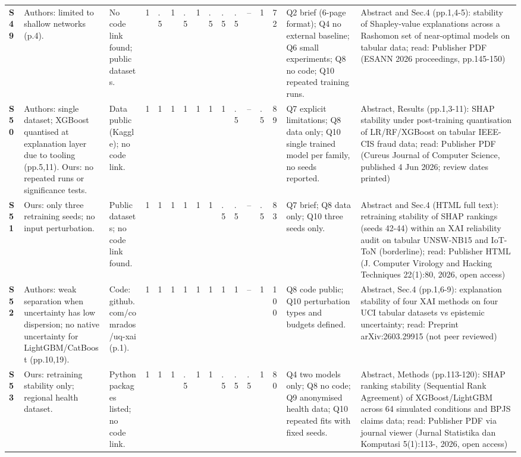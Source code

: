 \begin{longtable}{@{}P{1.0cm}P{4.6cm}P{3.6cm}P{0.3cm}P{0.3cm}P{0.3cm}P{0.3cm}P{0.3cm}P{0.3cm}P{0.3cm}P{0.3cm}P{0.3cm}P{0.36cm}P{0.75cm}P{3.0cm}P{3.9cm}@{}}
\textbf{S49} & Authors: limited to shallow networks (p.4). & No code link found; public datasets. & 1 & .5 & 1 & .5 & 1 & .5 & .5 & .5 & -- & 1 & 72 & Q2 brief (6-page format); Q4 no external baseline; Q6 small experiments; Q8 no code; Q10 repeated training runs. & Abstract and Sec.4 (pp.1,4-5): stability of Shapley-value explanations across a Rashomon set of near-optimal models on tabular data; read: Publisher PDF (ESANN 2026 proceedings, pp.145-150) \\
\textbf{S50} & Authors: single dataset; XGBoost quantised at explanation layer due to tooling (pp.5,11). Ours: no repeated runs or significance tests. & Data public (Kaggle); no code link. & 1 & 1 & 1 & 1 & 1 & 1 & 1 & .5 & -- & .5 & 89 & Q7 explicit limitations; Q8 data only; Q10 single trained model per family, no seeds reported. & Abstract, Results (pp.1,3-11): SHAP stability under post-training quantisation of LR/\allowbreak{}RF/\allowbreak{}XGBoost on tabular IEEE-CIS fraud data; read: Publisher PDF (Cureus Journal of Computer Science, published 4 Jun 2026; review dates printed) \\
\textbf{S51} & Ours: only three retraining seeds; no input perturbation. & Public datasets; no code link found. & 1 & 1 & 1 & 1 & 1 & 1 & .5 & .5 & -- & .5 & 83 & Q7 brief; Q8 data only; Q10 three seeds only. & Abstract and Sec.4 (HTML full text): retraining stability of SHAP rankings (seeds 42-44) within an XAI reliability audit on tabular UNSW-NB15 and IoT-ToN (borderline); read: Publisher HTML (J. Computer Virology and Hacking Techniques 22(1):80, 2026, open access) \\
\textbf{S52} & Authors: weak separation when uncertainty has low dispersion; no native uncertainty for LightGBM/\allowbreak{}CatBoost (pp.10,19). & Code: github.com/\allowbreak{}comrados/\allowbreak{}uq-xai (p.1). & 1 & 1 & 1 & 1 & 1 & 1 & 1 & 1 & -- & 1 & 100 & Q8 code public; Q10 perturbation types and budgets defined. & Abstract, Sec.4 (pp.1,6-9): explanation stability of four XAI methods on four UCI tabular datasets vs epistemic uncertainty; read: Preprint arXiv:2603.29915 (not peer reviewed) \\
\textbf{S53} & Ours: retraining stability only; regional health dataset. & Python packages listed; no code link. & 1 & 1 & 1 & .5 & 1 & 1 & .5 & .5 & .5 & 1 & 80 & Q4 two models only; Q8 no code; Q9 anonymised health data; Q10 repeated fits with fixed seeds. & Abstract, Methods (pp.113-120): SHAP ranking stability (Sequential Rank Agreement) of XGBoost/\allowbreak{}LightGBM across 64 simulated conditions and BPJS claims data; read: Publisher PDF via journal viewer (Jurnal Statistika dan Komputasi 5(1):113-, 2026, open access) \\

\end{longtable}
